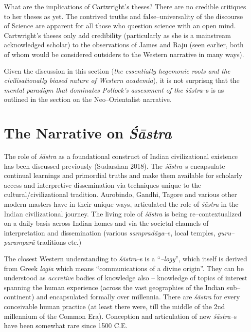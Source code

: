 What are the implications of Cartwright’s theses? There are no credible critiques to her theses as yet. The contrived truths and false–universality of the discourse of Science are apparent for all those who question science with an open mind. Cartwright’s theses only add credibility (particularly as she is a mainstream acknowledged scholar) to the observations of James and Raju (seen earlier, both of whom would be considered outsiders to the Western narrative in many ways).

Given the discussion in this section (\textit{the essentially hegemonic roots and the civilisationally biased nature of Western academia}), it is not surprisng that the \textit{mental paradigm that dominates Pollock’s assessment of the śāstra}–s is as outlined in the section on the Neo–Orientalist narrative.


\section*{The Narrative on \textit{Śāstra}}

The role of \textit{śāstra} as a foundational construct of Indian civilizational existence has been discussed previously (Sudarshan 2018). The \textit{śāstra}–s encapsulate continual learnings and primordial truths and make them available for scholarly access and interpretive dissemination via techniques unique to the cultural/civilizational tradition. Aurobindo, Gandhi, Tagore and various other modern masters have in their unique ways, articulated the role of \textit{śāstra} in the Indian civilizational journey. The living role of \textit{śāstra} is being re–contextualized on a daily basis across Indian homes and via the societal channels of interpretation and dissemination (various \textit{sampradāya}–s, local temples, \textit{guru–paramparā} traditions etc.)

The closest Western understanding to \textit{śāstra}–s is a “\textit{–logy}”, which itself is derived from Greek \textit{logia} which means “communications of a divine origin”. They can be understood as \textit{accretive} bodies of knowledge also – knowledge of topics of interest spanning the human experience (across the vast geographies of the Indian sub–continent) and encapsulated formally over millennia. There are \textit{śāstra} for every conceivable human practice (at least there were, till the middle of the 2nd millennium of the Common Era). Conception and articulation of new \textit{śāstra}–s have been somewhat rare since 1500 C.E.

